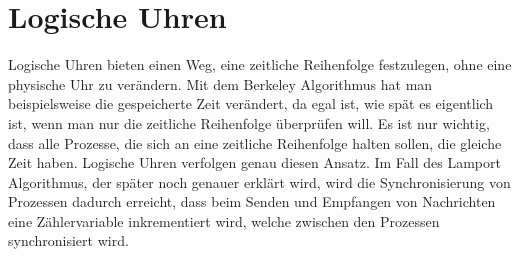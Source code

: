 \documentclass[a4paper,11pt]{report}
\begin{document}
\section{Logische Uhren}
Logische Uhren bieten einen Weg, eine zeitliche Reihenfolge festzulegen, ohne eine physische Uhr zu verändern. Mit dem Berkeley Algorithmus hat man beispielsweise die gespeicherte Zeit verändert, da egal ist, wie spät es eigentlich ist, wenn man nur die zeitliche Reihenfolge überprüfen will. Es ist nur wichtig, dass alle Prozesse, die sich an eine zeitliche Reihenfolge halten sollen, die gleiche Zeit haben. Logische Uhren verfolgen genau diesen Ansatz. Im Fall des Lamport Algorithmus, der später noch genauer erklärt wird, wird die Synchronisierung von Prozessen dadurch erreicht, dass beim Senden und Empfangen von Nachrichten eine Zählervariable inkrementiert wird, welche zwischen den Prozessen synchronisiert wird.
\end{document}
